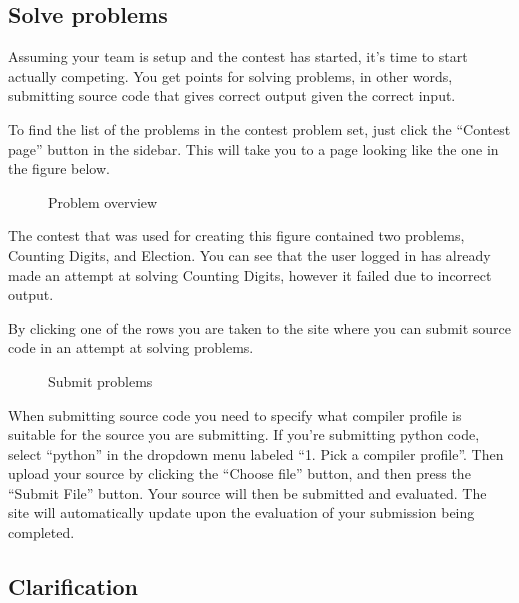 \bigskip

\subsection{Solve problems}

Assuming your team is setup and the contest has started,
it{\textquoteright}s time to start actually competing. You get points
for solving problems, in other words, submitting source code that gives
correct output given the correct input.


To find the list of the problems in the contest problem set, just click
the {\textquotedblleft}Contest page{\textquotedblright} button in the
sidebar. This will take you to a page looking like the one in the
figure below.


\begin{figure}
\centering
 \caption{Problem overview}
 \label{fig:problemOverview}
\end{figure}

The contest that was used for creating this figure contained two
problems, Counting Digits, and Election. You can see that the user
logged in has already made an attempt at solving Counting Digits,
however it failed due to incorrect output. 


\bigskip

By clicking one of the rows you are taken to the site where you can
submit source code in an attempt at solving problems. 

\begin{figure}
\centering
 \caption{Submit problems}
 \label{fig:submitProblem}
\end{figure}

When submitting source code you need to specify what compiler profile is
suitable for the source you are submitting. If you{\textquoteright}re
submitting python code, select
{\textquotedblleft}python{\textquotedblright} in the dropdown menu
labeled {\textquotedblleft}1. Pick a compiler
profile{\textquotedblright}. Then upload your source by clicking the
{\textquotedblleft}Choose file{\textquotedblright} button, and then
press the {\textquotedblleft}Submit File{\textquotedblright} button.
Your source will then be submitted and evaluated. The site will
automatically update upon the evaluation of your submission being
completed. \ 

\subsection{Clarification}

